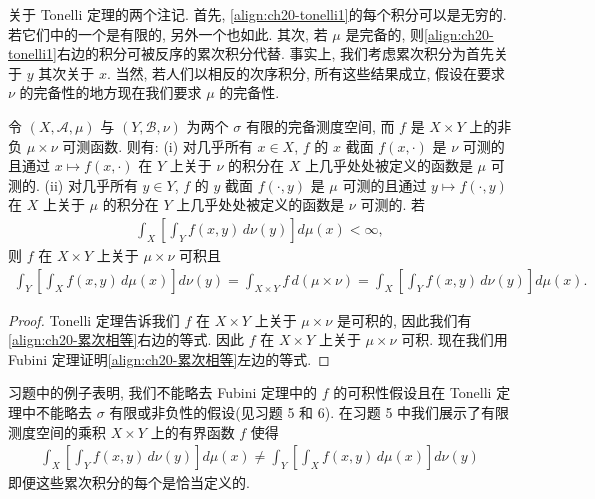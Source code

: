 \documentclass[../../main.tex]{subfiles}
\begin{document}
关于 Tonelli 定理的两个注记. 首先, \eqref{align:ch20-tonelli1}的每个积分可以是无穷的. 若它们中的一个是有限的, 另外一个也如此. 其次, 若 $\mu$ 是完备的, 则\eqref{align:ch20-tonelli1}右边的积分可被反序的累次积分代替. 事实上, 我们考虑累次积分为首先关于 $y$ 其次关于 $x$. 当然, 若人们以相反的次序积分, 所有这些结果成立, 假设在要求 $\nu$ 的完备性的地方现在我们要求 $\mu$ 的完备性.

\begin{corollary}[Tonelli]\label{corollary:ch20-tonelli累次}
令 $(X,\mathcal{A},\mu)$ 与 $(Y,\mathcal{B},\nu)$ 为两个 $\sigma$ 有限的完备测度空间, 而 $f$ 是 $X\times Y$ 上的非负 $\mu\times\nu$ 可测函数. 则有: (i) 对几乎所有 $x\in X$, $f$ 的 $x$ 截面 $f(x,\cdot)$ 是 $\nu$ 可测的且通过 $x\mapsto f(x,\cdot)$ 在 $Y$ 上关于 $\nu$ 的积分在 $X$ 上几乎处处被定义的函数是 $\mu$ 可测的. (ii) 对几乎所有 $y\in Y$, $f$ 的 $y$ 截面 $f(\cdot,y)$ 是 $\mu$ 可测的且通过 $y\mapsto f(\cdot,y)$ 在 $X$ 上关于 $\mu$ 的积分在 $Y$ 上几乎处处被定义的函数是 $\nu$ 可测的. 若
\begin{align}\label{align:ch20-累次有限}
\int_{X}\left[\int_{Y}f(x,y)\,d\nu(y)\right]d\mu(x)<\infty,
\end{align}
则 $f$ 在 $X\times Y$ 上关于 $\mu\times\nu$ 可积且
\begin{align}\label{align:ch20-累次相等}
\int_{Y}\left[\int_{X}f(x,y)\,d\mu(x)\right]d\nu(y)=\int_{X\times Y}f\,d(\mu\times\nu)=\int_{X}\left[\int_{Y}f(x,y)\,d\nu(y)\right]d\mu(x).
\end{align}
\end{corollary}

\begin{proof}
Tonelli 定理告诉我们 $f$ 在 $X\times Y$ 上关于 $\mu\times\nu$ 是可积的, 因此我们有\eqref{align:ch20-累次相等}右边的等式. 因此 $f$ 在 $X\times Y$ 上关于 $\mu\times\nu$ 可积. 现在我们用 Fubini 定理证明\eqref{align:ch20-累次相等}左边的等式.
\end{proof}

习题中的例子表明, 我们不能略去 Fubini 定理中的 $f$ 的可积性假设且在 Tonelli 定理中不能略去 $\sigma$ 有限或非负性的假设(见习题 5 和 6). 在习题 5 中我们展示了有限测度空间的乘积 $X\times Y$ 上的有界函数 $f$ 使得
\begin{align*}
\int_{X}\left[\int_{Y}f(x,y)\,d\nu(y)\right]d\mu(x)\neq\int_{Y}\left[\int_{X}f(x,y)\,d\mu(x)\right]d\nu(y)
\end{align*}
即便这些累次积分的每个是恰当定义的.
\end{document}
